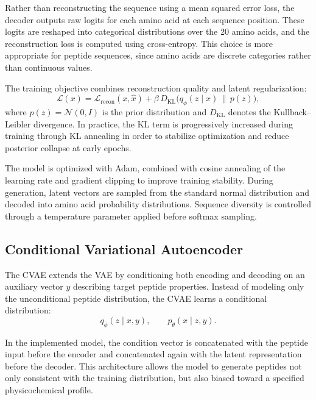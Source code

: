 Rather than reconstructing the sequence using a mean squared error loss, the decoder outputs raw logits for each amino acid at each sequence position. These logits are reshaped into categorical distributions over the 20 amino acids, and the reconstruction loss is computed using cross-entropy. This choice is more appropriate for peptide sequences, since amino acids are discrete categories rather than continuous values.

The training objective combines reconstruction quality and latent regularization:
\begin{equation}
\mathcal{L}(x) = \mathcal{L}_{\text{recon}}(x, \hat{x}) + \beta \, D_{\text{KL}}\bigl(q_{\phi}(z \mid x)\, \|\, p(z)\bigr),
\end{equation}
where $p(z)=\mathcal{N}(0,I)$ is the prior distribution and $D_{\text{KL}}$ denotes the Kullback--Leibler divergence. In practice, the KL term is progressively increased during training through KL annealing in order to stabilize optimization and reduce posterior collapse at early epochs.

The model is optimized with Adam, combined with cosine annealing of the learning rate and gradient clipping to improve training stability. During generation, latent vectors are sampled from the standard normal distribution and decoded into amino acid probability distributions. Sequence diversity is controlled through a temperature parameter applied before softmax sampling.

\subsection{Conditional Variational Autoencoder}

The CVAE extends the VAE by conditioning both encoding and decoding on an auxiliary vector $y$ describing target peptide properties. Instead of modeling only the unconditional peptide distribution, the CVAE learns a conditional distribution:
\begin{equation}
q_{\phi}(z \mid x, y), \qquad p_{\theta}(x \mid z, y).
\end{equation}

In the implemented model, the condition vector is concatenated with the peptide input before the encoder and concatenated again with the latent representation before the decoder. This architecture allows the model to generate peptides not only consistent with the training distribution, but also biased toward a specified physicochemical profile.

